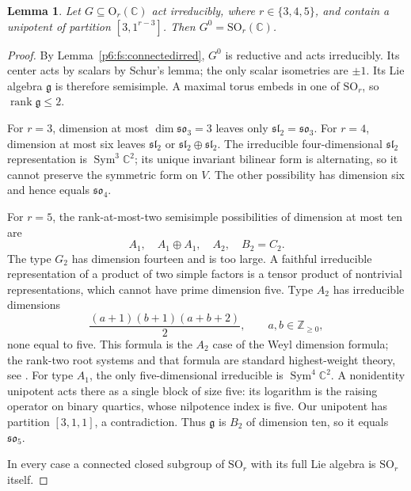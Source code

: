 \documentclass[11pt,a4paper]{article}
\newtheorem{lemma}[theorem]{Lemma}
\theoremstyle{definition}
\theoremstyle{remark}
\numberwithin{equation}{section}
\begin{document}
\begin{lemma}\label{p6:fs:smallgroups}
Let $G\subseteq\mathrm O_r(\mathbb C)$ act irreducibly, where
$r\in\{3,4,5\}$, and contain a unipotent of partition
$[3,1^{r-3}]$. Then $G^0=\mathrm{SO}_r(\mathbb C)$.
\end{lemma}
\begin{proof}
By Lemma~\ref{p6:fs:connectedirred}, $G^0$ is reductive and acts
irreducibly. Its center acts by scalars by Schur's lemma; the only
scalar isometries are $\pm1$. Its Lie algebra $\mathfrak g$ is
therefore semisimple. A maximal torus embeds in one of
$\mathrm{SO}_r$, so $\operatorname{rank}\mathfrak g\le2$.

For $r=3$, dimension at most $\dim\mathfrak{so}_3=3$ leaves only
$\mathfrak{sl}_2=\mathfrak{so}_3$. For $r=4$, dimension at most six
leaves $\mathfrak{sl}_2$ or $\mathfrak{sl}_2\oplus\mathfrak{sl}_2$.
The irreducible four-dimensional $\mathfrak{sl}_2$ representation
is $\operatorname{Sym}^3\mathbb C^2$; its unique invariant bilinear
form is alternating, so it cannot preserve the symmetric form on
$V$. The other possibility has dimension six and hence equals
$\mathfrak{so}_4$.

For $r=5$, the rank-at-most-two semisimple possibilities of
dimension at most ten are
\[
 A_1,\quad A_1\oplus A_1,\quad A_2,\quad B_2=C_2.
\]
The type $G_2$ has dimension fourteen and is too large. A faithful
irreducible representation of a product of two simple factors is
a tensor product of nontrivial representations, which cannot have
prime dimension five. Type $A_2$ has irreducible dimensions
\[
 \frac{(a+1)(b+1)(a+b+2)}2,\qquad a,b\in\mathbb Z_{\ge0},
\]
none equal to five. This formula is the $A_2$ case of the Weyl
dimension formula; the rank-two root systems and that formula are
standard highest-weight theory, see \cite{p6:FS_Etingof2020}.
For type $A_1$, the only five-dimensional irreducible is
$\operatorname{Sym}^4\mathbb C^2$. A nonidentity unipotent acts
there as a single block of size five: its logarithm is the raising
operator on binary quartics, whose nilpotence index is five.
Our unipotent has partition $[3,1,1]$, a contradiction.
Thus $\mathfrak g$ is $B_2$ of dimension ten, so it equals
$\mathfrak{so}_5$.

In every case a connected closed subgroup of $\mathrm{SO}_r$
with its full Lie algebra is $\mathrm{SO}_r$ itself.
\end{proof}
\end{document}
